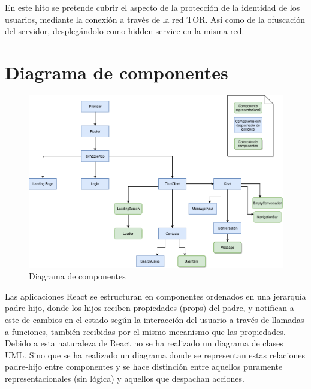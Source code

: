 En este hito se pretende cubrir el aspecto de la protección de la identidad de los usuarios, mediante la conexión a través de la red TOR. Así como de la ofuscación del servidor, desplegándolo como hidden service \cite{HiddenServiceTorProject} en la misma red. \\

\section{Diagrama de componentes}

\begin{figure}[H]
	\centering
	\includegraphics[width=\textwidth]{imagenes/diagrama-componentes}
	\caption{Diagrama de componentes}
	\label{fig:diagrama-componentes}
\end{figure}

Las aplicaciones React se estructuran en componentes ordenados en una jerarquía padre-hijo, donde los hijos reciben propiedades (props) del padre, y notifican a este de cambios en el estado según la interacción del usuario a través de llamadas a funciones, también recibidas por el mismo mecanismo que las propiedades.\\ 

Debido a esta naturaleza de React no se ha realizado un diagrama de clases UML. Sino que se ha realizado un diagrama donde se representan estas relaciones padre-hijo entre componentes y se hace distinción entre aquellos puramente representacionales (sin lógica) y aquellos que despachan acciones. \\ 